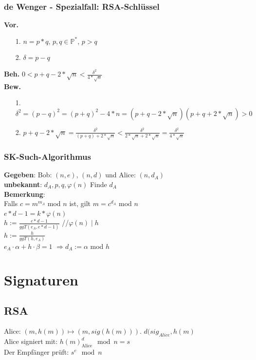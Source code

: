 \documentclass[landscape,twocolumn,a4paper]{article}
\newcommand{\PN}{\mathbb{P}} %
\newcommand{\Bold}[1]{\textbf{#1}} %
\newcommand{\Ra}{\Rightarrow}
\begin{document}
\subsubsection{de Wenger - Spezialfall: RSA-Schlüssel}
\Bold{Vor.}
\begin{itemize}
	\item[1.] $n=p*q$, $p,q \in \PN^*$, $p>q$ 
	\item[2.] $\delta=p-q$
\end{itemize}
\Bold{Beh.} $0 < p+q - 2 * \sqrt{n} < \frac{\delta^2}{4 * \sqrt{n}}$ \\
\Bold{Bew.}
\begin{itemize}
	\item[1.] $\delta^2= (p-q)^2=(p+q)^2-4*n=(p+q-2*\sqrt{n})(p+q+2*\sqrt{n})>0$ 
	\item[2.] $p+q-2*\sqrt{n} = \frac{\delta^2}{(p+q)+2*\sqrt{n}} < \frac{\delta^2}{2*\sqrt{n}+2*\sqrt{n}}= \frac{\delta^2}{4 * \sqrt{n}}$
\end{itemize}
\subsubsection{SK-Such-Algorithmus}
{
\textbf{Gegeben}: Bob: $(n,e)$, $(n,d)$ und Alice: $(n,d_A)$ \\
\textbf{unbekannt}: $d_A,p,q,\varphi(n)$ Finde $d_A$ \\
\textbf{Bemerkung}: \\
    Falls $c=m^{m_A}$ mod $n$ ist, gilt $m=c^{d_A}$ mod $n$ \\
    $e*d-1=k*\varphi(n)$ \\
    $h:=\frac{e*d-1}{ggT(e_A,e*d-1)}$ \hspace*{2cm}//$\varphi(n)\mid h$\\
    $h:=\frac{h}{ggT(h,e_A)}$ \\
    $e_A\cdot\alpha+h\cdot\beta=1 $ {\color{red}$\Ra d_A:=\alpha$ mod $h$}
}
\section{Signaturen}
\subsection{RSA}
Alice: $(m, h(m)) \mapsto (m, sig(h(m)))$. $d(sig_{Alice}, h(m)$ \\ Alice signiert mit: $h(m)^d_{\text{Alice}} \mod n = s$ \\
Der Empfänger prüft: $s^e \mod n$
\end{document}
